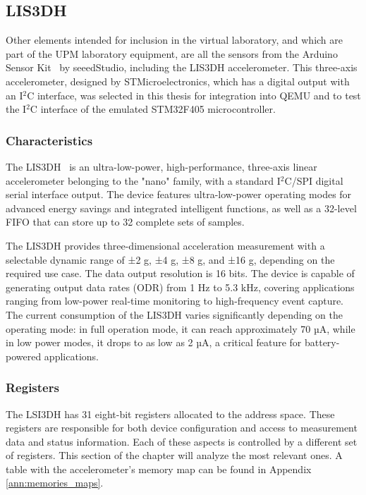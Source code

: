 \subsection{LIS3DH}
\label{chap:analysis_lis3dh}

Other elements intended for inclusion in the virtual laboratory, and which are 
part of the UPM laboratory equipment, are all the sensors from the Arduino Sensor 
Kit~\cite{seeedstudio_sensor_kit} by seeedStudio, including the LIS3DH accelerometer. This three-axis 
accelerometer, designed by STMicroelectronics, which has a digital output with an 
I$^2$C interface, was selected in this thesis for integration into QEMU and to test the 
I$^2$C interface of the emulated STM32F405 microcontroller.

\subsubsection{Characteristics}

The LIS3DH~\cite{LIS3DHDatasheet2016} is an ultra-low-power, high-performance, three-axis 
linear accelerometer belonging to the "nano" family, with a standard I$^2$C/SPI digital 
serial interface output. The device features ultra-low-power operating modes for 
advanced energy savings and integrated intelligent functions, as well as a 32-level 
FIFO that can store up to 32 complete sets of samples.

The LIS3DH provides three-dimensional acceleration measurement with a 
selectable dynamic range of ±2 g, ±4 g, ±8 g, and ±16 g, depending on the required 
use case. The data output resolution is 16 bits. The device is capable of generating 
output data rates (ODR) from 1 Hz to 5.3 kHz, covering applications ranging from 
low-power real-time monitoring to high-frequency event capture. The current 
consumption of the LIS3DH varies significantly depending on the operating mode: in 
full operation mode, it can reach approximately 70 µA, while in low power modes, 
it drops to as low as 2 µA, a critical feature for battery-powered applications.

\subsubsection{Registers}

The LSI3DH has 31 eight-bit registers allocated to the address space. These 
registers are responsible for both device configuration and access to measurement 
data and status information. Each of these aspects is controlled by a different set 
of registers. This section of the chapter will analyze the most relevant ones. A table 
with the accelerometer's memory map can be found in Appendix \ref{ann:memories_maps}.

